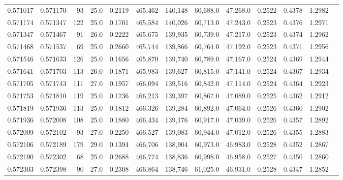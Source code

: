 \begin{tabular}{rrrrrrrrrrrrr}
0.571017 & 0.571170 &    93 & 25.0 &                                     0.2119 & 465,462 & 140,148 &  60,688.0 &  47,268.0 & 0.2522 & 0.4378 & 1.2982 \\
0.571174 & 0.571347 &   122 & 25.0 &                                     0.1701 & 465,584 & 140,026 &  60,713.0 &  47,243.0 & 0.2523 & 0.4376 & 1.2971 \\
0.571347 & 0.571467 &    91 & 26.0 &                                     0.2222 & 465,675 & 139,935 &  60,739.0 &  47,217.0 & 0.2523 & 0.4374 & 1.2962 \\
0.571468 & 0.571537 &    69 & 25.0 &                                     0.2660 & 465,744 & 139,866 &  60,764.0 &  47,192.0 & 0.2523 & 0.4371 & 1.2956 \\
0.571546 & 0.571633 &   126 & 25.0 &                                     0.1656 & 465,870 & 139,740 &  60,789.0 &  47,167.0 & 0.2524 & 0.4369 & 1.2944 \\
0.571641 & 0.571703 &   113 & 26.0 &                                     0.1871 & 465,983 & 139,627 &  60,815.0 &  47,141.0 & 0.2524 & 0.4367 & 1.2934 \\
0.571705 & 0.571743 &   111 & 27.0 &                                     0.1957 & 466,094 & 139,516 &  60,842.0 &  47,114.0 & 0.2524 & 0.4364 & 1.2923 \\
0.571753 & 0.571810 &   119 & 25.0 &                                     0.1736 & 466,213 & 139,397 &  60,867.0 &  47,089.0 & 0.2525 & 0.4362 & 1.2912 \\
0.571819 & 0.571936 &   113 & 25.0 &                                     0.1812 & 466,326 & 139,284 &  60,892.0 &  47,064.0 & 0.2526 & 0.4360 & 1.2902 \\
0.571936 & 0.572008 &   108 & 25.0 &                                     0.1880 & 466,434 & 139,176 &  60,917.0 &  47,039.0 & 0.2526 & 0.4357 & 1.2892 \\
0.572009 & 0.572102 &    93 & 27.0 &                                     0.2250 & 466,527 & 139,083 &  60,944.0 &  47,012.0 & 0.2526 & 0.4355 & 1.2883 \\
0.572106 & 0.572189 &   179 & 29.0 &                                     0.1394 & 466,706 & 138,904 &  60,973.0 &  46,983.0 & 0.2528 & 0.4352 & 1.2867 \\
0.572190 & 0.572302 &    68 & 25.0 &                                     0.2688 & 466,774 & 138,836 &  60,998.0 &  46,958.0 & 0.2527 & 0.4350 & 1.2860 \\
0.572303 & 0.572398 &    90 & 27.0 &                                     0.2308 & 466,864 & 138,746 &  61,025.0 &  46,931.0 & 0.2528 & 0.4347 & 1.2852 \\

\end{tabular}
